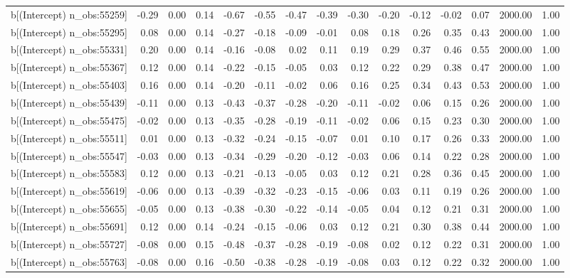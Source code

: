 \begin{table}[ht]
\begin{tabular}{rrrrrrrrrrrrrrr}
  b[(Intercept) n\_obs:55259] & -0.29 & 0.00 & 0.14 & -0.67 & -0.55 & -0.47 & -0.39 & -0.30 & -0.20 & -0.12 & -0.02 & 0.07 & 2000.00 & 1.00 \\ 
  b[(Intercept) n\_obs:55295] & 0.08 & 0.00 & 0.14 & -0.27 & -0.18 & -0.09 & -0.01 & 0.08 & 0.18 & 0.26 & 0.35 & 0.43 & 2000.00 & 1.00 \\ 
  b[(Intercept) n\_obs:55331] & 0.20 & 0.00 & 0.14 & -0.16 & -0.08 & 0.02 & 0.11 & 0.19 & 0.29 & 0.37 & 0.46 & 0.55 & 2000.00 & 1.00 \\ 
  b[(Intercept) n\_obs:55367] & 0.12 & 0.00 & 0.14 & -0.22 & -0.15 & -0.05 & 0.03 & 0.12 & 0.22 & 0.29 & 0.38 & 0.47 & 2000.00 & 1.00 \\ 
  b[(Intercept) n\_obs:55403] & 0.16 & 0.00 & 0.14 & -0.20 & -0.11 & -0.02 & 0.06 & 0.16 & 0.25 & 0.34 & 0.43 & 0.53 & 2000.00 & 1.00 \\ 
  b[(Intercept) n\_obs:55439] & -0.11 & 0.00 & 0.13 & -0.43 & -0.37 & -0.28 & -0.20 & -0.11 & -0.02 & 0.06 & 0.15 & 0.26 & 2000.00 & 1.00 \\ 
  b[(Intercept) n\_obs:55475] & -0.02 & 0.00 & 0.13 & -0.35 & -0.28 & -0.19 & -0.11 & -0.02 & 0.06 & 0.15 & 0.23 & 0.30 & 2000.00 & 1.00 \\ 
  b[(Intercept) n\_obs:55511] & 0.01 & 0.00 & 0.13 & -0.32 & -0.24 & -0.15 & -0.07 & 0.01 & 0.10 & 0.17 & 0.26 & 0.33 & 2000.00 & 1.00 \\ 
  b[(Intercept) n\_obs:55547] & -0.03 & 0.00 & 0.13 & -0.34 & -0.29 & -0.20 & -0.12 & -0.03 & 0.06 & 0.14 & 0.22 & 0.28 & 2000.00 & 1.00 \\ 
  b[(Intercept) n\_obs:55583] & 0.12 & 0.00 & 0.13 & -0.21 & -0.13 & -0.05 & 0.03 & 0.12 & 0.21 & 0.28 & 0.36 & 0.45 & 2000.00 & 1.00 \\ 
  b[(Intercept) n\_obs:55619] & -0.06 & 0.00 & 0.13 & -0.39 & -0.32 & -0.23 & -0.15 & -0.06 & 0.03 & 0.11 & 0.19 & 0.26 & 2000.00 & 1.00 \\ 
  b[(Intercept) n\_obs:55655] & -0.05 & 0.00 & 0.13 & -0.38 & -0.30 & -0.22 & -0.14 & -0.05 & 0.04 & 0.12 & 0.21 & 0.31 & 2000.00 & 1.00 \\ 
  b[(Intercept) n\_obs:55691] & 0.12 & 0.00 & 0.14 & -0.24 & -0.15 & -0.06 & 0.03 & 0.12 & 0.21 & 0.30 & 0.38 & 0.44 & 2000.00 & 1.00 \\ 
  b[(Intercept) n\_obs:55727] & -0.08 & 0.00 & 0.15 & -0.48 & -0.37 & -0.28 & -0.19 & -0.08 & 0.02 & 0.12 & 0.22 & 0.31 & 2000.00 & 1.00 \\ 
  b[(Intercept) n\_obs:55763] & -0.08 & 0.00 & 0.16 & -0.50 & -0.38 & -0.28 & -0.19 & -0.08 & 0.03 & 0.12 & 0.22 & 0.32 & 2000.00 & 1.00 \\ 

\end{tabular}
\end{table}
